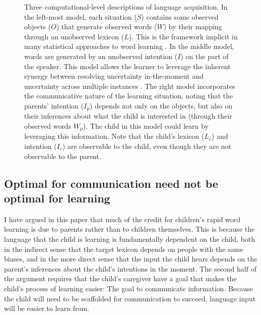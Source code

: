 \documentclass[review]{elsarticle}
\begin{document}
\begin{figure}[tb]
   	\centering
    \begin{subfigure}[b]{0.2\textwidth}
    	\centering
        \resizebox{\linewidth}{!}{}  
    \end{subfigure}
   	\hfill
    \begin{subfigure}[b]{0.2\textwidth}
    	\centering
        \resizebox{\linewidth}{!}{}  
    \end{subfigure}
    \hfill
    \begin{subfigure}[b]{0.3\textwidth}
    	\centering
        \resizebox{\linewidth}{!}{}  
    \end{subfigure}
   	

  \caption{Three computational-level descriptions of language acquisition. In the left-most model, each situation ($S$) contains some observed objects ($O$) that generate observed words ($W$) by their mapping through an unobserved lexicon ($L$). This is the framework implicit in many statistical approaches to word learning \citep[e.g.][]{siskind1996,yu2008,yurovsky2014}. In the middle model, words are generated by an unobserved intention ($I$) on the part of the speaker. This model allows the learner to leverage the inherent synergy between resolving uncertainty in-the-moment and uncertainty across multiple instances \citep{frank2009}. The right model incorporates the communicative nature of the learning situation, noting that the parents' intention ($I_{p}$) depends not only on the objects, but also on their inferences about what the child is interested in (through their observed words $W_{p}$). The child in this model could learn by leveraging this information. Note that the child's lexicon ($L_{c}$) and intention ($I_{c}$) are observable to the child, even though they are not observable to the parent.}
  \label{fig:model} 
\end{figure}


\subsection{Optimal for communication need not be optimal for learning}

I have argued in this paper that much of the credit for children's rapid word learning is due to parents rather than to children themselves. This is because the language that the child is learning is fundamentally dependent on the child, both in the indirect sense that the target lexicon depends on people with the same biases, and in the more direct sense that the input the child hears depends on the parent's inferences about the child's intentions in the moment. The second half of the argument requires that the child's caregiver have a goal that makes the child's process of learning easier: The goal to communicate information. Because the child will need to be scaffolded for communication to succeed, language input will be easier to learn from. 
\end{document}
